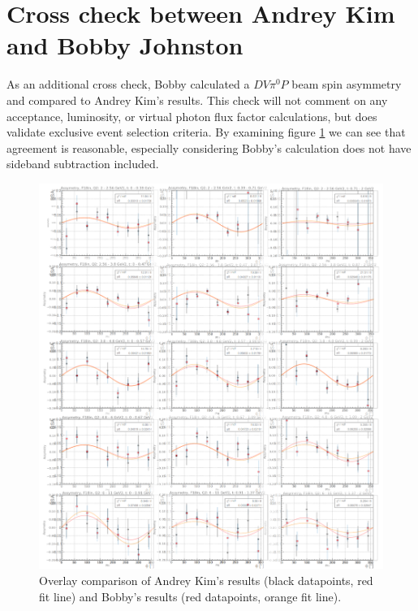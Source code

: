 \section{Cross check between Andrey Kim and Bobby Johnston}

As an additional cross check, Bobby calculated a $DV\pi^0P$ beam spin asymmetry and compared to Andrey Kim's results. This check will not comment on any acceptance, luminosity, or virtual photon flux factor calculations, but does validate exclusive event selection criteria. By examining figure \ref{fig:bsa} we can see that agreement is reasonable, especially considering Bobby's calculation does not have sideband subtraction included.

\begin{figure}[hbt]
	\centering
	\includegraphics[width=0.75\linewidth]{Postamble/appb_pics/BSA.png}
	
	
	\caption{Overlay comparison of Andrey Kim's results (black datapoints, red fit line) and Bobby's results (red datapoints, orange fit line).}
	\label{fig:bsa}
\end{figure}

